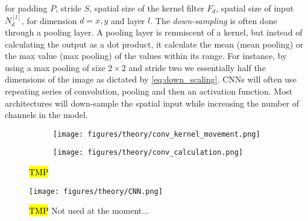 for padding $P$, stride $S$, spatial size of the kernel filter $F_d$, spatial size
of input $N_d^{[l]}$, for dimension $d = {x, y}$ and layer $l$. The \textit{down-sampling} is often done through a pooling layer. A pooling layer is remniscent of a kernel, but instead of calculating the output as a dot product, it calculate the mean (mean pooling) or the max value (max pooling) of the values within its range. For instance, by using a max pooling of size $2 \times 2$ and stride two we essentially half the dimensions of the image as dictated by \cref{eq:down_scaling}. \acrshort{CNN}s will often use repeating series of convolution, pooling and then an activation function. Most architectures will down-sample the spatial input while increasing the number of channels in the model.


\begin{figure}[H]
  \centering
  \begin{subfigure}[t]{0.26\textwidth}
    \centering
    \texttt{[image: figures/theory/conv\_kernel\_movement.png]}
    \caption{}
  \end{subfigure}
  \hfill
  \begin{subfigure}[t]{0.70\textwidth}
    \centering
    \texttt{[image: figures/theory/conv\_calculation.png]}
    \caption{}
    \label{fig:conv_calculation}
  \end{subfigure}
  \hfill
  \caption{\hl{TMP}}
  \label{fig:conv_example}
\end{figure}

\begin{figure}[H]
  \centering
  \texttt{[image: figures/theory/CNN.png]}
  \caption{\hl{TMP} Not used at the moment...}
  \label{fig:CNN}
\end{figure}


